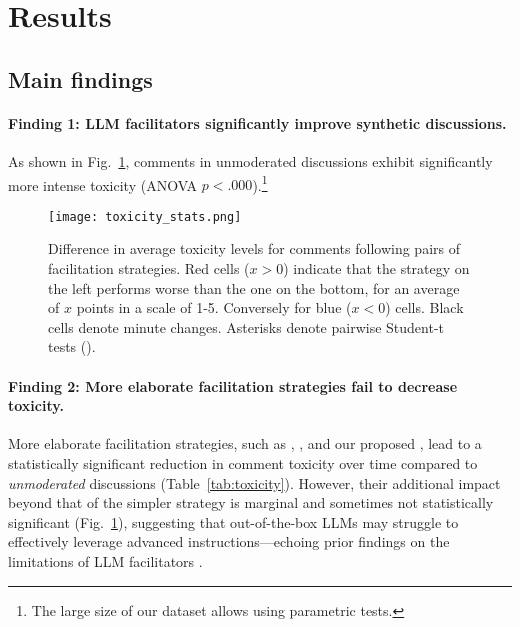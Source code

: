 %

\section{Results}
\label{sec:results}


\subsection{Main findings}
\label{ssec:results:main}

\paragraph{Finding 1: \ac{LLM} facilitators significantly improve synthetic discussions.} As shown in Fig.~\ref{fig:toxicity_stats}, comments in unmoderated discussions exhibit significantly more intense toxicity (ANOVA $p<.000$).\footnote{The large size of our dataset allows using parametric tests.} 

\begin{figure}
	\texttt{[image: toxicity\_stats.png]}
	\centering
	\caption{Difference in average toxicity levels for comments following pairs of facilitation strategies. Red cells ($x>0$) indicate that the strategy on the left performs worse than the one on the bottom, for an average of $x$ points in a scale of 1-5. Conversely for blue ($x<0$) cells. Black cells denote minute changes. Asterisks denote pairwise Student-t tests (\asterisknote).}
	\label{fig:toxicity_stats}
\end{figure}

\paragraph{Finding 2: More elaborate facilitation strategies fail to decrease toxicity.}
More elaborate facilitation strategies, such as \emph{\strategyregroom}, \emph{\strategyconstrcomm}, and our proposed \emph{\strategymodgame}, lead to a statistically significant reduction in comment toxicity over time compared to \emph{unmoderated} discussions (Table~\ref{tab:toxicity}). However, their additional impact beyond that of the simpler \emph{\strategynoinstr} strategy is marginal and sometimes not statistically significant (Fig.~\ref{fig:toxicity_stats}), suggesting that out-of-the-box \acp{LLM} may struggle to effectively leverage advanced instructions---echoing prior findings on the limitations of \ac{LLM} facilitators \cite{cho-etal-2024-language}.



